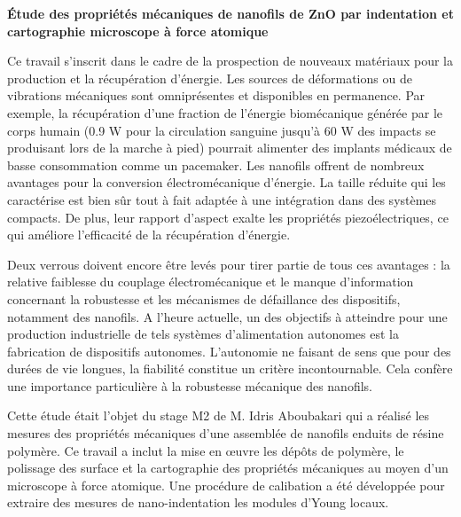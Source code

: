 
	\bigskip
	\textbf{\textsf{\'Etude des propriétés mécaniques de nanofils de ZnO par indentation et cartographie microscope à force atomique}}

Ce travail s'inscrit dans le cadre de la prospection de nouveaux matériaux pour la production et la récupération d'énergie. Les sources de déformations ou de vibrations mécaniques sont omniprésentes et disponibles en permanence. Par exemple, la récupération d'une fraction de l'énergie biomécanique générée par le corps humain (0.9 W pour la circulation sanguine jusqu'à 60 W des impacts se produisant lors de la marche à pied) pourrait alimenter des implants médicaux de basse consommation comme un pacemaker.
%
Les nanofils offrent de nombreux avantages pour la conversion électromécanique d'énergie. La taille réduite qui les caractérise est bien sûr tout à fait adaptée à une intégration dans des systèmes compacts. De plus, leur rapport d’aspect exalte les propriétés piezoélectriques, ce qui améliore l’efficacité de la récupération d’énergie.

Deux verrous doivent encore être levés pour tirer partie de tous ces avantages : la relative faiblesse du couplage électromécanique et le manque d'information concernant la robustesse et les mécanismes de défaillance des dispositifs, notamment des nanofils. A l'heure actuelle, un des objectifs à atteindre pour une production industrielle de tels systèmes d'alimentation autonomes est la fabrication de dispositifs autonomes. L'autonomie ne faisant de sens que pour des durées de vie longues, la fiabilité constitue un critère incontournable. Cela confère une importance particulière à la robustesse mécanique des nanofils.

Cette étude était l'objet du stage M2 de M. Idris Aboubakari qui a réalisé les mesures des propriétés mécaniques d’une assemblée de nanofils enduits de résine polymère.
Ce travail a inclut la mise en \oe uvre les dépôts de polymère, le polissage des surface et la cartographie des propriétés mécaniques au moyen d’un microscope à force atomique. 
Une procédure de calibation a été développée pour extraire des mesures de nano-indentation les modules d'Young locaux.

